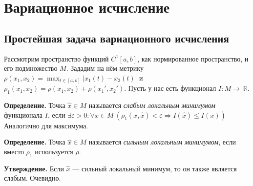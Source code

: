 



\section{Вариационное исчисление}
\subsection{Простейшая задача вариационного исчисления}
Рассмотрим пространство функций $C^1[a, b]$, как нормированное пространство, и его подмножество $M$.
Зададим на нём метрику $\rho(x_1, x_2) = \max_{t \in [a, b]} |x_1(t) - x_2(t)|$ и $\rho_1(x_1, x_2) = \rho(x_1, x_2) + \rho(x_1', x_2')$.
Пусть у нас есть функционал $I: M \to\ \mathbb R$.

\textbf{Определение.} Точка $\widehat x \in M$ называется \textit{слабым локальным минимумом} функционала $I$, если $\exists \varepsilon > 0: \forall x \in M~(\rho_1(x, \widehat x) < \varepsilon \Rightarrow I(\widehat x) \le I(x))$
Аналогично для максимума.

\textbf{Определение.} Точка $\widehat x \in M$ называется \textit{сильным локальным минимумом}, если вместо $\rho_1$ используется $\rho$.

\textbf{Утверждение.} Если $\widehat x$ --- сильный локальный минимум, то он также является слабым. Очевидно.

